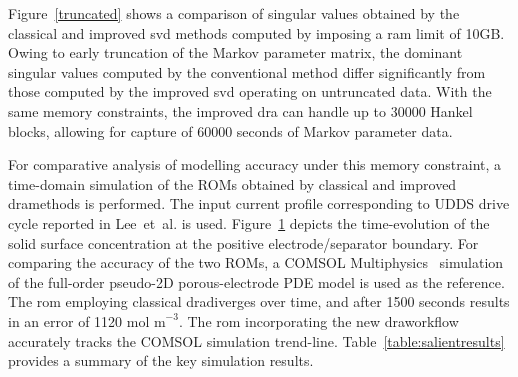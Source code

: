 Figure~\ref{truncated} shows a comparison of singular values obtained
by the classical and improved \gls{svd} methods computed by imposing a \gls{ram}
limit of 10GB. Owing to early truncation of the Markov parameter matrix,
the dominant singular values computed by the conventional method differ
significantly from those computed by the improved \gls{svd} operating on
untruncated data. With the same memory constraints, the improved \gls{dra}
can handle up to 30000 Hankel blocks, allowing for capture of 60000
seconds of Markov parameter data.

For comparative analysis of modelling accuracy under this memory constraint,
a time-domain simulation of the ROMs obtained by classical and improved
\gls{dra}methods is performed. The input current profile corresponding
to UDDS drive cycle reported in Lee~et~al. \cite{LeeChemistruckPlett2012}
is used. Figure~\ref{time_domain_sim} depicts the time-evolution
of the solid surface concentration at the positive electrode/separator
boundary. For comparing the accuracy of the two ROMs, a COMSOL Multiphysics~\cite{Multiphysics2012}
simulation of the full-order pseudo-2D porous-electrode PDE model
is used as the reference. The \gls{rom} employing classical \gls{dra}diverges
over time, and after 1500 seconds results in an error of 1120$\text{ mol m}^{-\text{3}}$$.$
The \gls{rom} incorporating the new \gls{dra}workflow accurately tracks the COMSOL
simulation trend-line. Table~\ref{table:salientresults} provides
a summary of the key simulation results.

\begin{figure}
	\caption{}
	\label{time_domain_sim}
\end{figure}

